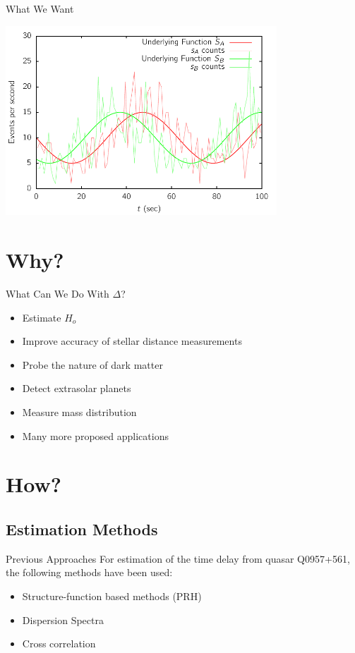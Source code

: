 \documentclass{beamer}
\begin{document}
\begin{frame}{What We Want}
  \begin{center}
      \includegraphics[width=4in]{twostreams_full}
  \end{center}
\end{frame}

\section{Why?}

\begin{frame}{What Can We Do With $\Delta$?}
  \begin{itemize}
  \item<2-> Estimate $H_o$
  \item<3-> Improve accuracy of stellar distance measurements
  \item<4-> Probe the nature of dark matter
  \item<5-> Detect extrasolar planets
  \item<6-> Measure mass distribution
  \item<7-> Many more proposed applications
  \end{itemize}
\end{frame}

\section{How?}

\subsection{Estimation Methods}

\begin{frame}{Previous Approaches}
  For estimation of the time delay from quasar Q0957+561, the following methods have been used:
  \begin{itemize}
  \item Structure-function based methods (PRH)
  \item Dispersion Spectra
  \item Cross correlation
  \end{itemize}
\end{frame}
\end{document}
